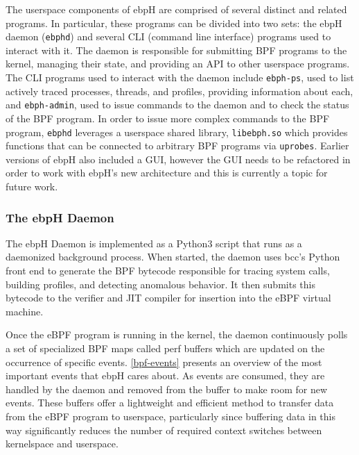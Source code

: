 \documentclass[
  12pt]{findlay}
\newcommand{\passthrough}[1]{#1}
\begin{document}
The userspace components of ebpH are comprised of several distinct and
related programs. In particular, these programs can be divided into two
sets: the ebpH daemon (\passthrough{\lstinline!ebphd!}) and several CLI
(command line interface) programs used to interact with it. The daemon
is responsible for submitting BPF programs to the kernel, managing their
state, and providing an API to other userspace programs. The CLI
programs used to interact with the daemon include
\passthrough{\lstinline!ebph-ps!}, used to list actively traced
processes, threads, and profiles, providing information about each, and
\passthrough{\lstinline!ebph-admin!}, used to issue commands to the
daemon and to check the status of the BPF program. In order to issue
more complex commands to the BPF program,
\passthrough{\lstinline!ebphd!} leverages a userspace shared library,
\passthrough{\lstinline!libebph.so!} which provides functions that can
be connected to arbitrary BPF programs via
\passthrough{\lstinline!uprobes!}. Earlier versions of ebpH also
included a GUI, however the GUI needs to be refactored in order to work
with ebpH's new architecture and this is currently a topic for future
work.

\hypertarget{the-ebph-daemon}{%
\subsubsection{The ebpH Daemon}\label{the-ebph-daemon}}

The ebpH Daemon is implemented as a Python3 script that runs as a
daemonized background process. When started, the daemon uses bcc's
Python front end \autocite{bcc} to generate the BPF bytecode responsible
for tracing system calls, building profiles, and detecting anomalous
behavior. It then submits this bytecode to the verifier and JIT compiler
for insertion into the eBPF virtual machine.

Once the eBPF program is running in the kernel, the daemon continuously
polls a set of specialized BPF maps called perf buffers which are
updated on the occurrence of specific events. \autoref{bpf-events}
presents an overview of the most important events that ebpH cares about.
As events are consumed, they are handled by the daemon and removed from
the buffer to make room for new events. These buffers offer a
lightweight and efficient method to transfer data from the eBPF program
to userspace, particularly since buffering data in this way
significantly reduces the number of required context switches between
kernelspace and userspace.
\end{document}
